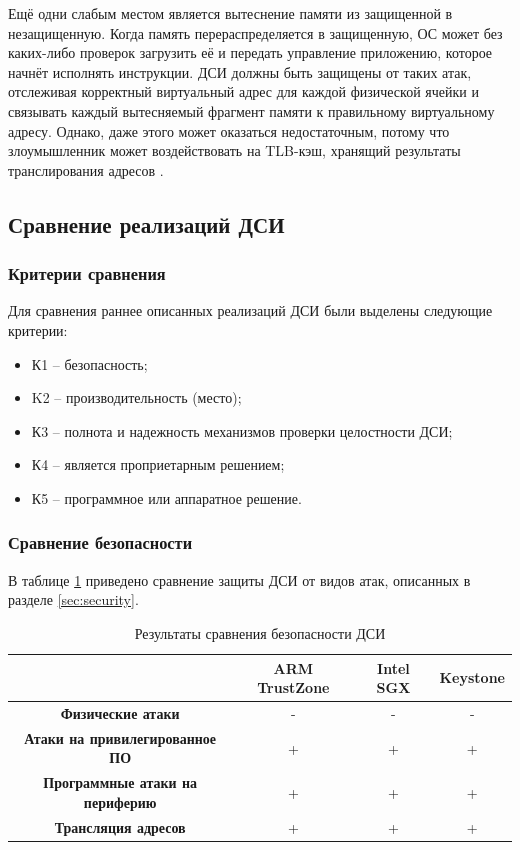 Ещё одни слабым местом является вытеснение памяти из защищенной в незащищенную. Когда память перераспределяется в защищенную, ОС может без каких-либо проверок загрузить её и передать управление приложению, которое начнёт исполнять инструкции. ДСИ должны быть защищены от таких атак, отслеживая корректный виртуальный адрес для каждой физической ячейки и связывать каждый вытесняемый фрагмент памяти к правильному виртуальному адресу. Однако, даже этого может оказаться недостаточным, потому что злоумышленник может воздействовать на TLB-кэш, хранящий результаты транслирования адресов \cite{attack-on-chip}.

\subsection{Сравнение реализаций ДСИ}

\subsubsection{Критерии сравнения}

Для сравнения раннее описанных реализаций ДСИ были выделены следующие критерии:

\begin{itemize}
	\item К1 -- безопасность;
	\item K2 -- производительность (место);
	\item К3 -- полнота и надежность механизмов проверки целостности ДСИ;
	\item К4 -- является проприетарным решением;
	\item К5 -- программное или аппаратное решение.
\end{itemize}

\subsubsection{Сравнение безопасности}

В таблице \ref{table:security-features} приведено сравнение защиты ДСИ от видов атак, описанных в разделе \ref{sec:security}.

\begin{table}[!htb]
	\begin{center}
		\caption{Результаты сравнения безопасности ДСИ}
		\label{table:security-features}
		\begin{tabular}{|c|c|c|c|}
			\hline
			& \bfseries ARM TrustZone & \bfseries Intel SGX & \bfseries Keystone \\
			\hline
			\bfseries Физические атаки & - & - & - \\ \hline
			\bfseries Атаки на привилегированное ПО & + & + & + \\ \hline
			\bfseries Программные атаки на периферию & + & + & + \\ \hline	
			\bfseries Трансляция адресов & + & + & + \\ \hline	
		\end{tabular}
	\end{center}
\end{table}

